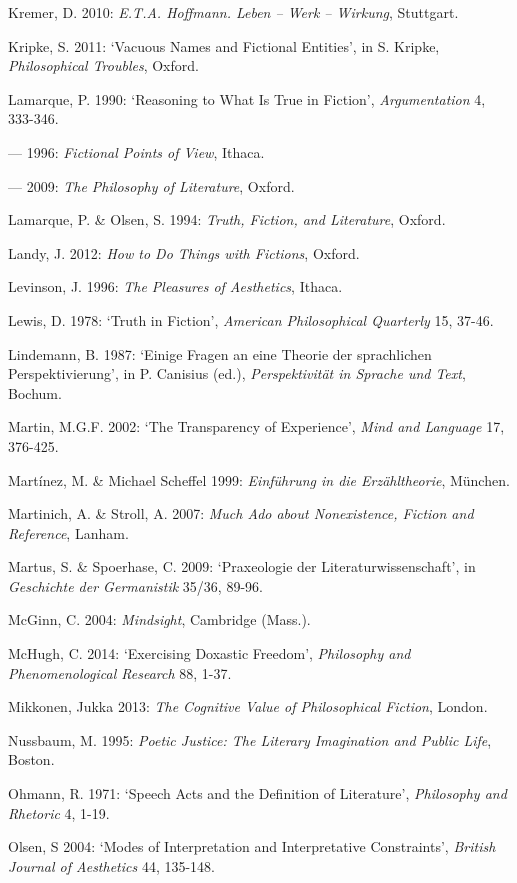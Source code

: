 \begin{hangparas}{.5cm}{1}
Kremer, D. 2010: \emph{E.T.A. Hoffmann. Leben -- Werk -- Wirkung}, Stuttgart.

Kripke, S. 2011: `Vacuous Names and Fictional Entities', in S. Kripke, \emph{Philosophical Troubles}, Oxford.

Lamarque, P. 1990: `Reasoning to What Is True in Fiction', \emph{Argumentation} 4, 333-346.

--- 1996: \emph{Fictional Points of View}, Ithaca. 

--- 2009: \emph{The Philosophy of Literature}, Oxford. 

Lamarque, P. \& Olsen, S. 1994: \emph{Truth, Fiction, and Literature}, Oxford.

Landy, J. 2012: \emph{How to Do Things with Fictions}, Oxford.

Levinson, J. 1996: \emph{The Pleasures of Aesthetics}, Ithaca.

Lewis, D. 1978: `Truth in Fiction', \emph{American Philosophical Quarterly} 15, 37-46.

Lindemann, B. 1987: `Einige Fragen an eine Theorie der sprachlichen Perspektivierung', in P. Canisius (ed.), \emph{Perspektivit\"at in Sprache und Text}, Bochum.

Martin, M.G.F. 2002: `The Transparency of Experience', \emph{Mind and Language} 17, 376-425.

Mart\'inez, M. \& Michael Scheffel 1999: \emph{Einf\"uhrung in die Erz\"ahltheorie}, M\"unchen.

Martinich, A. \& Stroll, A. 2007: \emph{Much Ado about Nonexistence, Fiction and Reference}, Lanham.

Martus, S. \& Spoerhase, C. 2009: `Praxeologie der Literaturwissenschaft', in \emph{Geschichte der Germanistik} 35/36, 89-96.

McGinn, C. 2004: \emph{Mindsight}, Cambridge (Mass.).

McHugh, C. 2014: `Exercising Doxastic Freedom', \emph{Philosophy and Phenomenological Research} 88, 1-37.

Mikkonen, Jukka 2013: \emph{The Cognitive Value of Philosophical Fiction}, London.

Nussbaum, M. 1995: \emph{Poetic Justice: The Literary Imagination and Public Life}, Boston.

Ohmann, R. 1971: `Speech Acts and the Definition of Literature', \emph{Philosophy and Rhetoric} 4, 1-19.

Olsen, S 2004: `Modes of Interpretation and Interpretative Constraints', \emph{British Journal of Aesthetics} 44, 135-148.


\end{hangparas}
